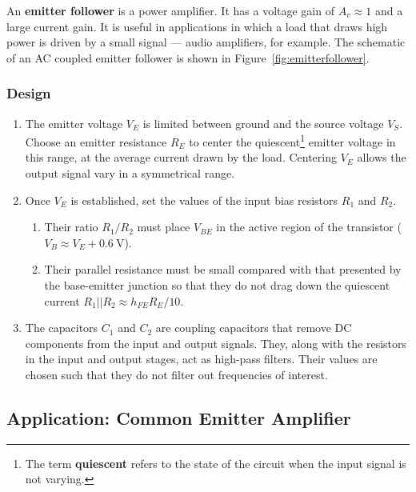 \documentclass[11pt]{article}
\begin{document}
An \textbf{emitter follower} is a power amplifier. It has a voltage
gain of $A_v \approx 1$ and a large current gain. It is useful in
applications in which a load that draws high power is driven by a
small signal --- audio amplifiers, for example.  The schematic of an
AC coupled emitter follower is shown in
Figure~\ref{fig:emitterfollower}.

\subsubsection*{Design}

\begin{enumerate}
\item The emitter voltage $V_E$ is limited between ground and the
  source voltage $V_S$. Choose an emitter resistance $R_E$ to center
  the quiescent\footnote{The term \textbf{quiescent} refers to the
  state of the circuit when the input signal is not varying.}  emitter
  voltage in this range, at the average current drawn by the
  load. Centering $V_E$ allows the output signal vary in a symmetrical
  range.

\item Once $V_E$ is established, set the values of the input bias
  resistors $R_1$ and $R_2$.
  \begin{enumerate}
  \item Their ratio $R_1/R_2$ must place $V_{BE}$ in the active region
    of the transistor ($V_B \approx V_E + 0.6~\mathrm{V}$).

  \item Their parallel resistance must be small compared with that
    presented by the base-emitter junction so that they do not drag
    down the quiescent current $R_1 || R_2 \approx h_{FE} R_E/ 10$.
  \end{enumerate}

\item The capacitors $C_1$ and $C_2$ are coupling capacitors that
  remove DC components from the input and output signals. They, along
  with the resistors in the input and output stages, act as high-pass
  filters. Their values are chosen such that they do not filter out
  frequencies of interest.
\end{enumerate}

\subsection{Application: Common Emitter Amplifier}
\label{sec:commonemitter}
\end{document}
